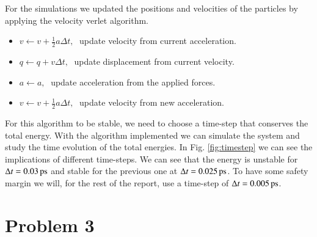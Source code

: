 For the simulations we updated the positions and velocities of the particles by applying the velocity verlet algorithm.

\begin{itemize}
\item $v \leftarrow v +\frac{1}{2}a\Delta t, \;$ update velocity from current acceleration.
\item $q \leftarrow q +v\Delta t, \;$ update displacement from current velocity.
\item $a \leftarrow a, \;$ update acceleration from the applied forces.
\item $v \leftarrow v +\frac{1}{2}a\Delta t, \;$ update velocity from new acceleration.
\end{itemize}

For this algorithm to be stable, we need to choose a time-step that conserves the total energy. With the algorithm implemented we can simulate the system and study the time evolution of the total energies. In Fig. \ref{fig:timestep} we can see the implications of different time-steps. We can see that the energy is unstable for $\Delta t = \unit[0.03]{ps}$ and stable for the previous one at $\Delta t = \unit[0.025]{ps}$. To have some safety margin we will, for the rest of the report, use a time-step of $\Delta t = \unit[0.005]{ps}$.



\section*{Problem 3}

